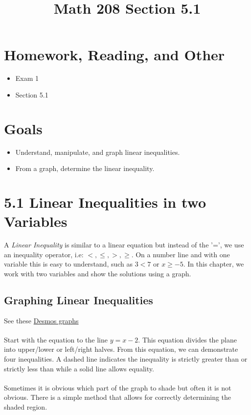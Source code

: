 \documentclass[14pt]{extarticle}
\title{\vspace{-5ex}Math 208 Section 5.1}
\date{\vspace{-10ex}}
\begin{document}
\maketitle		
\section*{Homework, Reading, and Other}
\begin{itemize}
	\item Exam 1
	\item Section 5.1
\end{itemize}

\section*{Goals}
\begin{itemize}
	\item Understand, manipulate, and graph linear inequalities.
	\item From a graph, determine the linear inequality.
\end{itemize}

\section*{5.1 Linear Inequalities in two Variables}
A \textit{Linear Inequality} is similar to a linear equation but instead of the '=',  we use an inequality operator, i.e: $ <, \leq , >, \geq$. On a number line and with one variable this is easy to understand, such as $ 3<7$ or $x \geq -5$. In this chapter, we work with two variables and show the solutions using a graph.

\subsection{Graphing Linear Inequalities}
See these \href{https://www.desmos.com/calculator/fyoyd1n4op}{Desmos graphs}
\\\\
Start with the equation to the line $y = x-2$. This equation divides the plane into upper/lower or left/right halves. From this equation, we can demonstrate four inequalities. A dashed line indicates the inequality is strictly greater than or strictly less than while a solid line allows equality.
\\\\
Sometimes it is obvious which part of the graph to shade but often it is not obvious. There is a simple method that allows for correctly determining the shaded region.
\end{document}
